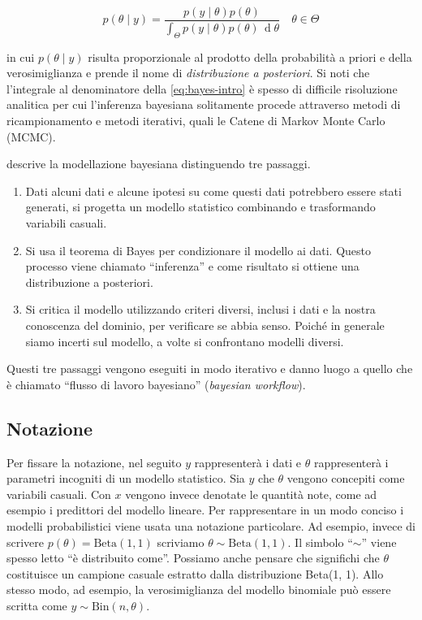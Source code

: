 \documentclass[
  11pt,
]{krantz}
\providecommand{\tightlist}{%
  \setlength{\itemsep}{0pt}\setlength{\parskip}{0pt}}
\theoremstyle{definition}
\theoremstyle{definition}
\theoremstyle{definition}
\theoremstyle{definition}
\theoremstyle{remark}
\begin{document}
\begin{equation}
p(\theta \mid y) = \frac{p(y \mid \theta) p(\theta)}{\int_{\Theta}p(y \mid \theta) p(\theta) \,\operatorname {d}\!\theta} \quad \theta \in \Theta
\label{eq:bayes-intro}
\end{equation}

in cui \(p(\theta \mid y)\) risulta proporzionale al prodotto della probabilità a priori e della verosimiglianza e prende il nome di \emph{distribuzione a posteriori}. Si noti che l'integrale al denominatore della \eqref{eq:bayes-intro} è spesso di difficile risoluzione analitica per cui l'inferenza bayesiana solitamente procede attraverso metodi di ricampionamento e metodi iterativi, quali le Catene di Markov Monte Carlo (MCMC).

\citet{martin2022bayesian} descrive la modellazione bayesiana distinguendo tre passaggi.

\begin{enumerate}
\def\labelenumi{\arabic{enumi}.}
\tightlist
\item
  Dati alcuni dati e alcune ipotesi su come questi dati potrebbero essere stati generati, si progetta un modello statistico combinando e trasformando variabili casuali.
\item
  Si usa il teorema di Bayes per condizionare il modello ai dati. Questo processo viene chiamato ``inferenza'' e come risultato si ottiene una distribuzione a posteriori.
\item
  Si critica il modello utilizzando criteri diversi, inclusi i dati e la nostra conoscenza del dominio, per verificare se abbia senso. Poiché in generale siamo incerti sul modello, a volte si confrontano modelli diversi.
\end{enumerate}

Questi tre passaggi vengono eseguiti in modo iterativo e danno luogo a quello che è chiamato ``flusso di lavoro bayesiano'' (\emph{bayesian workflow}).

\hypertarget{notazione}{%
\subsection{Notazione}\label{notazione}}

Per fissare la notazione, nel seguito \(y\) rappresenterà i dati e \(\theta\) rappresenterà i parametri incogniti di un modello statistico. Sia \(y\) che \(\theta\) vengono concepiti come variabili casuali. Con \(x\) vengono invece denotate le quantità note, come ad esempio i predittori del modello lineare. Per rappresentare in un modo conciso i modelli probabilistici viene usata una notazione particolare. Ad esempio, invece di scrivere \(p(\theta) = \mbox{Beta}(1, 1)\) scriviamo \(\theta \sim \mbox{Beta}(1, 1)\). Il simbolo ``\(\sim\)'' viene spesso letto ``è distribuito come''. Possiamo anche pensare che significhi che \(\theta\) costituisce un campione casuale estratto dalla distribuzione Beta(1, 1). Allo stesso modo, ad esempio, la verosimiglianza del modello binomiale può essere scritta come \(y \sim \text{Bin}(n, \theta)\).
\end{document}
